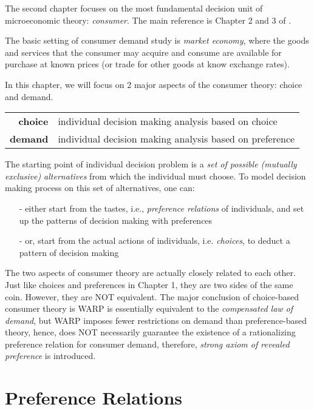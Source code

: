 \minitoc

\vspace{0.5cm}
The second chapter focuses on the most fundamental decision unit of microeconomic theory: \textit{consumer}. The main reference is Chapter 2 and 3 of \citet{mas1995microeconomic}.

The basic setting of consumer demand study is \textit{market economy}, where the goods and services that the consumer may acquire and consume are available for purchase at known prices (or trade for other goods at know exchange rates).

In this chapter, we will focus on 2 major aspects of the consumer theory: choice and demand.
\begin{center}
    \begin{tabular}{rl}
    \hline
    \textbf{choice} & individual decision making analysis based on choice\\ 
    \textbf{demand} & individual decision making analysis based on preference \\ 
    \hline
    \end{tabular}
\end{center}

The starting point of individual decision problem is a \textit{set of possible (mutually exclusive) alternatives} from which the individual must choose. To model decision making process
on this set of alternatives, one can:
\begin{enumerate}
    \item[-] either start from the tastes, i.e., \textit{preference relations} of individuals, and set up the patterns of decision making with preferences
    \item[-] or, start from the actual actions of individuals, i.e. \textit{choices}, to deduct a pattern of decision making
\end{enumerate}

The two aspects of consumer theory are actually closely related to each other. Just like choices and preferences in Chapter 1, they are two sides of the same coin. However, they are NOT equivalent.
The major conclusion of choice-based consumer theory is WARP is essentially equivalent to the \textit{compensated law of demand}, but WARP imposes fewer restrictions on demand than preference-based theory,
hence, does NOT necessarily guarantee the existence of a rationalizing preference relation for consumer demand, therefore, \textit{strong axiom of revealed preference} is introduced.

\section{Preference Relations}\label{chap2:sec1}
%

